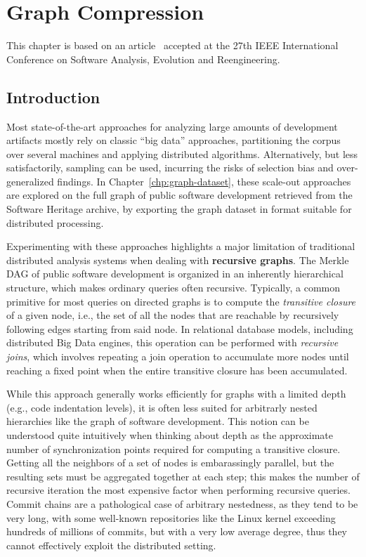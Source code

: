\chapter{Graph Compression}%
\label{chp:graph-compression}

This chapter is based on an article~\cite{saner-2020-swh-graph} accepted at the
27th IEEE International Conference on Software Analysis, Evolution and
Reengineering.

\section{Introduction}%
\label{sec:compression-intro}

Most state-of-the-art approaches for analyzing large amounts of development
artifacts mostly rely on classic ``big data'' approaches, partitioning the
corpus over several machines and applying distributed algorithms.
Alternatively, but less satisfactorily, sampling can be used, incurring the
risks of selection bias and over-generalized findings.
In Chapter~\ref{chp:graph-dataset}, these scale-out approaches are explored on
the full graph of public software development retrieved from the Software
Heritage archive, by exporting the graph dataset in format suitable for
distributed processing.

Experimenting with these approaches highlights a major limitation of
traditional distributed analysis systems when dealing with \textbf{recursive
graphs}. The Merkle \gls{DAG} of public software development is organized in an
inherently hierarchical structure, which makes ordinary queries often
recursive.
Typically, a common primitive for most queries on directed graphs is to
compute the \emph{transitive closure} of a given node, i.e., the set of all the
nodes that are reachable by recursively following edges starting from said
node. In relational database models, including distributed Big Data engines,
this operation can be performed with \emph{recursive joins}, which involves
repeating a join operation to accumulate more nodes until reaching a fixed
point when the entire transitive closure has been accumulated.

While this approach generally works efficiently for graphs with a limited depth
(e.g., code indentation levels), it is often less suited for arbitrarly nested
hierarchies like the graph of software development.
This notion can be understood quite intuitively when thinking about depth as
the approximate number of synchronization points required for computing a
transitive closure. Getting all the neighbors of a set of nodes is
embarassingly parallel, but the resulting sets must be aggregated together at
each step; this makes the number of recursive iteration the most expensive
factor when performing recursive queries.
Commit chains are a pathological case of arbitrary nestedness, as they tend to
be very long, with some well-known repositories like the Linux kernel exceeding
hundreds of millions of commits, but with a very low average degree, thus they
cannot effectively exploit the distributed setting.

